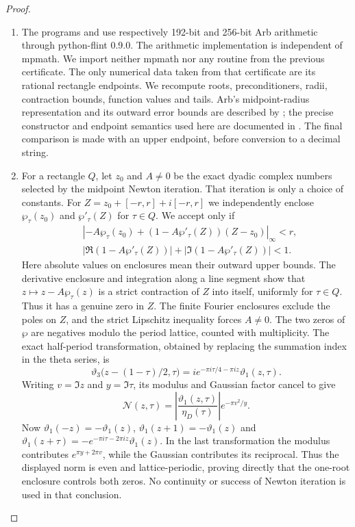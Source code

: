 \begin{proof}

\begin{enumerate}[label=\arabic*.,leftmargin=*]
\item The programs  and
 use respectively 192-bit and 256-bit
Arb arithmetic through python-flint 0.9.0. The arithmetic implementation
is independent of mpmath. We import neither mpmath nor any routine
from the previous certificate. The only numerical data taken from that
certificate are its rational rectangle endpoints. We recompute roots,
preconditioners, radii, contraction bounds, function values and tails.
Arb's midpoint-radius representation and its outward error bounds are
described by \citet[Section~2, pp.~2--4, and Section~3, pp.~4--6]{Johansson2016}; the precise
constructor and endpoint semantics used here are documented in
\citet{PythonFlint2026}. The final comparison is made with an upper
endpoint, before conversion to a decimal string.

\item For a rectangle $Q$, let $z_0$ and $A\ne0$ be the exact dyadic complex
numbers selected by the midpoint Newton iteration. That iteration is
only a choice of constants. For $Z=z_0+[-r,r]+i[-r,r]$ we independently
enclose $\wp_\tau(z_0)$ and $\wp'_\tau(Z)$ for $\tau\in Q$.
We accept only if
\[
 \begin{split}
 &\left|-A\wp_\tau(z_0)
 +(1-A\wp'_\tau(Z))(Z-z_0)\right|_\infty<r,\\
 &|\Re(1-A\wp'_\tau(Z))|
       +|\Im(1-A\wp'_\tau(Z))|<1.
 \end{split}
\]
Here absolute values on enclosures mean their outward upper bounds.
The derivative enclosure and integration along a line segment show
that $z\mapsto z-A\wp_\tau(z)$ is a strict contraction of $Z$ into
itself, uniformly for $\tau\in Q$. Thus it has a genuine zero in $Z$.
The finite Fourier enclosures exclude the poles on $Z$, and the strict
Lipschitz inequality forces $A\ne0$. The two zeros of $\wp$ are
negatives modulo the period lattice, counted with multiplicity. The
exact half-period transformation, obtained by replacing the summation
index in the theta series, is
\[
 \vartheta_3\bigl(z-(1-\tau)/2,\tau\bigr)
   =i e^{-\pi i\tau/4-\pi i z}\vartheta_1(z,\tau).
\]
Writing $v=\Im z$ and $y=\Im\tau$, its modulus and Gaussian factor
cancel to give
\[
 \mathcal N(z,\tau)=
 \left|\frac{\vartheta_1(z,\tau)}{\eta_D(\tau)}\right|
 e^{-\pi v^2/y}.
\]
Now $\vartheta_1(-z)=-\vartheta_1(z)$,
$\vartheta_1(z+1)=-\vartheta_1(z)$ and
$\vartheta_1(z+\tau)=-e^{-\pi i\tau-2\pi i z}\vartheta_1(z)$.
In the last transformation the modulus contributes
$e^{\pi y+2\pi v}$, while the Gaussian contributes its reciprocal.
Thus the displayed norm is even and lattice-periodic, proving directly
that the one-root enclosure controls both zeros. No continuity or
success of Newton iteration is used in that conclusion.


\end{enumerate}
\end{proof}
